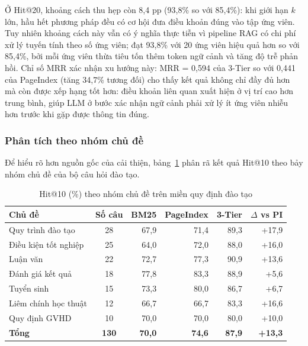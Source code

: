 Ở Hit@20, khoảng cách thu hẹp còn 8,4 pp (93,8\% so với 85,4\%): khi giới hạn $k$ lớn,
hầu hết phương pháp đều có cơ hội đưa điều khoản đúng vào tập ứng viên. Tuy nhiên
khoảng cách này vẫn có ý nghĩa thực tiễn vì pipeline RAG có chi phí xử lý tuyến tính theo
số ứng viên; đạt 93,8\% với 20 ứng viên hiệu quả hơn so với 85,4\%, bởi mỗi ứng viên
thừa tiêu tốn thêm token ngữ cảnh và tăng độ trễ phản hồi. Chỉ số MRR xác nhận xu
hướng này: MRR = 0,594 của 3-Tier so với 0,441 của PageIndex (tăng 34,7\% tương đối)
cho thấy kết quả không chỉ đầy đủ hơn mà còn được xếp hạng tốt hơn: điều khoản liên
quan xuất hiện ở vị trí cao hơn trung bình, giúp LLM ở bước xác nhận ngữ cảnh phải xử
lý ít ứng viên nhiễu hơn trước khi gặp được thông tin đúng.

\subsubsection*{Phân tích theo nhóm chủ đề}

Để hiểu rõ hơn nguồn gốc của cải thiện, bảng~\ref{tab:hit10-chude} phân rã kết quả
Hit@10 theo bảy nhóm chủ đề của bộ câu hỏi đào tạo.

\begin{table}[htbp]
  \centering
  \caption{Hit@10 (\%) theo nhóm chủ đề trên miền quy định đào tạo}
  \label{tab:hit10-chude}
  \small
  \begin{tabular}{lcrrrr}
    \toprule
    \textbf{Chủ đề} & \textbf{Số câu} & \textbf{BM25} & \textbf{PageIndex} & \textbf{3-Tier} & \textbf{$\Delta$ vs PI} \\
    \midrule
    Quy trình đào tạo    & 28 & 67{,}9 & 71{,}4 & 89{,}3 & +17{,}9 \\
    Điều kiện tốt nghiệp & 25 & 64{,}0 & 72{,}0 & 88{,}0 & +16{,}0 \\
    Luận văn              & 22 & 72{,}7 & 77{,}3 & 90{,}9 & +13{,}6 \\
    Đánh giá kết quả      & 18 & 77{,}8 & 83{,}3 & 88{,}9 & +5{,}6  \\
    Tuyển sinh            & 15 & 73{,}3 & 80{,}0 & 86{,}7 & +6{,}7  \\
    Liêm chính học thuật  & 12 & 66{,}7 & 66{,}7 & 83{,}3 & +16{,}6 \\
    Quy định GVHD         & 10 & 70{,}0 & 70{,}0 & 80{,}0 & +10{,}0 \\
    \midrule
    \textbf{Tổng}         & \textbf{130} & \textbf{70{,}0} & \textbf{74{,}6} & \textbf{87{,}9} & \textbf{+13{,}3} \\
    \bottomrule
  \end{tabular}
\end{table}

